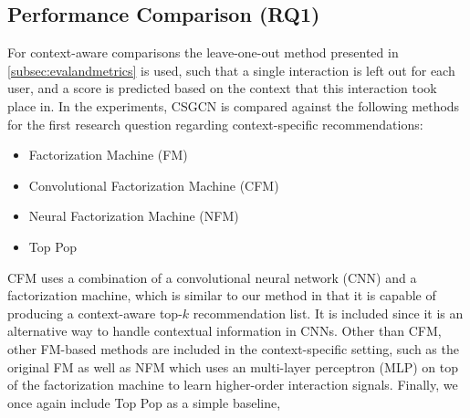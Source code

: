 \subsection{Performance Comparison (RQ1)}
For context-aware comparisons the leave-one-out method presented in \cref{subsec:evalandmetrics} is used, such that a single interaction is left out for each user, and a score is predicted based on the context that this interaction took place in.
In the experiments, CSGCN is compared against the following methods for the first research question regarding context-specific recommendations:
\begin{itemize}
    \item Factorization Machine (FM)\cite{fmrendle}
    \item Convolutional Factorization Machine (CFM) \cite{CFM}
    \item Neural Factorization Machine (NFM) \cite{NeuralFM}
    \item Top Pop
\end{itemize}
CFM uses a combination of a convolutional neural network (CNN) and a factorization machine, which is similar to our method in that it is capable of producing a context-aware top-$k$ recommendation list.
It is included since it is an alternative way to handle contextual information in CNNs.
Other than CFM, other FM-based methods are included in the context-specific setting, such as the original FM as well as NFM which uses an multi-layer perceptron (MLP) on top of the factorization machine to learn higher-order interaction signals.
Finally, we once again include Top Pop as a simple baseline, 



